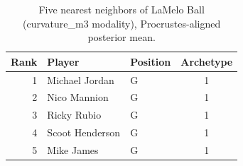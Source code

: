 \begin{table}[htbp]
  \centering\small
  \begin{tabular}{rllc}
    \toprule
    Rank & Player & Position & Archetype \\
    \midrule
    1 & Michael Jordan & G & 1 \\
    2 & Nico Mannion & G & 1 \\
    3 & Ricky Rubio & G & 1 \\
    4 & Scoot Henderson & G & 1 \\
    5 & Mike James & G & 1 \\
    \bottomrule
  \end{tabular}
  \caption{Five nearest neighbors of LaMelo Ball (curvature_m3 modality), Procrustes-aligned posterior mean.}
  \label{tab:LaMelo_Ball_neighbors_curvature_m3}
\end{table}


